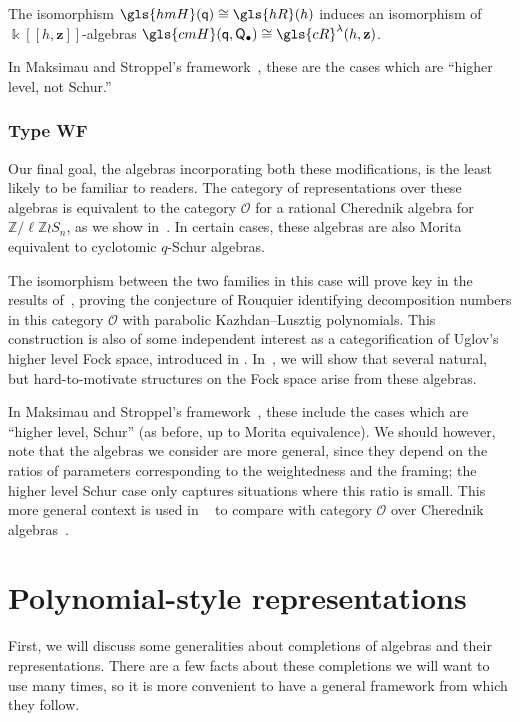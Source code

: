 \documentclass[ALCO,ThmDefs,Unicode,epreuves]{cedram}
\newcommand{\Bz}{\mathbf{z}}
\newcommand{\pq}{\mathsf{q}}
\newcommand{\K}{\Bbbk}%
\newcommand{\Z}{\mathbb{Z}}
\newcommand{\la}{\lambda}
\newcommand{\PQ}{\mathsf{Q}}
\newcommand{\cO}{\mathcal{O}}
\newcommand{\hmH}{\gls{hmH}}
\newcommand{\hR}{\gls{hR}}
\newcommand\llbracket{[\![}
\newcommand\rrbracket{]\!]}
\begin{document}
\begin{theorem}
 The isomorphism $\hmH(\pq)\cong \hR(h)$ induces an isomorphism of
 $\K\llbracket h,\Bz\rrbracket $-algebras $\gls{cmH}(\pq,\PQ_\bullet)\cong \gls{cR}^{\la}(h,\Bz)$.
\end{theorem}


In Maksimau and Stroppel's framework~\cite{MS18}, these are the cases which are
 ``higher level, not Schur.''

\subsubsection*{Type WF} 

Our final goal, the algebras incorporating both these modifications,
is the least likely to be familiar to readers. The category of
representations over these algebras is equivalent to the category
$\cO$ for a rational Cherednik algebra for $\Z/\ell\Z \wr S_n $, as
we show in~\cite{WebRou}. In certain cases, these algebras are also
Morita equivalent to cyclotomic $q$-Schur algebras.

The isomorphism between the two families in
this case will prove key in the results of~\cite{WebRou}, proving the
conjecture of Rouquier identifying decomposition numbers in this
category $\cO$ with parabolic Kazhdan--Lusztig polynomials. This
construction is also of some independent interest as a
categorification of Uglov's higher level Fock space, introduced in
\cite{Uglov}. In~\cite{WebRou}, we will show that several natural,
but hard-to-motivate structures on the Fock space arise from these
algebras.

In Maksimau and Stroppel's framework~\cite{MS18}, these include the cases which are
 ``higher level, Schur'' (as before, up to Morita equivalence). We should however, note that the algebras
 we consider are more general, since they depend on the ratios of
 parameters corresponding to the weightedness and the framing; the
 higher level Schur case only captures situations where this ratio is
 small. This more general context is used in
~\cite{WebRou,Webalt} to compare with category $\cO$ over Cherednik
 algebras~\cite{GGOR}.




\section{Polynomial-style representations}
\label{sec:polyn-style-repr}
First, we will discuss some generalities about completions of algebras
and their representations. There are a few facts about these
completions we will want to use many times, so it is more convenient
to have a general framework from which they follow. 
\end{document}
